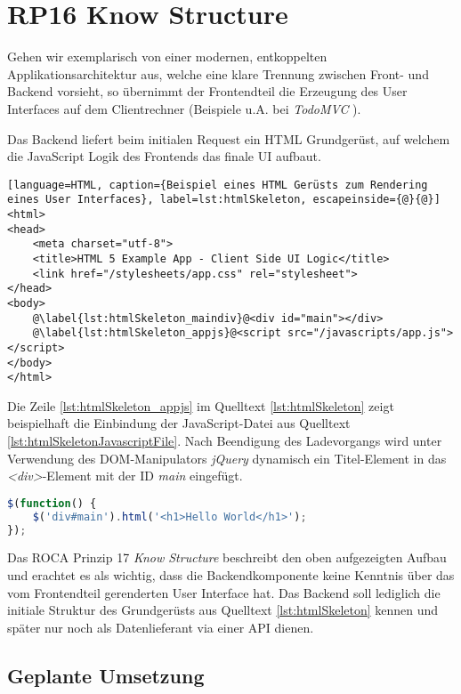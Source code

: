 \section{RP16 Know Structure}
\label{sec:principle-rp16-know-structure}

Gehen wir exemplarisch von einer modernen, entkoppelten Applikationsarchitektur aus, welche eine klare Trennung zwischen Front- und Backend vorsieht, so übernimmt der Frontendteil die Erzeugung des User Interfaces auf dem Clientrechner (Beispiele u.A. bei \emph{TodoMVC} \cite{TodoMVC}).

Das Backend liefert beim initialen Request ein HTML Grundgerüst, auf welchem die JavaScript Logik des Frontends das finale UI aufbaut.

\begin{lstlisting}[language=HTML, caption={Beispiel eines HTML Gerüsts zum Rendering eines User Interfaces}, label=lst:htmlSkeleton, escapeinside={@}{@}]
<html>
<head>
	<meta charset="utf-8">
	<title>HTML 5 Example App - Client Side UI Logic</title>
	<link href="/stylesheets/app.css" rel="stylesheet">
</head>
<body>
	@\label{lst:htmlSkeleton_maindiv}@<div id="main"></div>
	@\label{lst:htmlSkeleton_appjs}@<script src="/javascripts/app.js"></script>
</body>
</html>
\end{lstlisting}

Die Zeile \autoref{lst:htmlSkeleton_appjs} im Quelltext \ref{lst:htmlSkeleton} zeigt beispielhaft die Einbindung der JavaScript-Datei aus Quelltext \ref{lst:htmlSkeletonJavascriptFile}. Nach Beendigung des Ladevorgangs wird unter Verwendung des \gls{DOM}-Manipulators \emph{jQuery} \cite{jQuery} dynamisch ein Titel-Element in das \emph{<div>}-Element mit der ID \emph{main} eingefügt.

\begin{lstlisting}[language=JavaScript, caption={JavaScript-Datei \emph{app.js} zu Quelltext \ref{lst:htmlSkeleton}}, label=lst:htmlSkeletonJavascriptFile]
$(function() {
	$('div#main').html('<h1>Hello World</h1>');
});
\end{lstlisting}

Das ROCA Prinzip 17 \emph{Know Structure} beschreibt den oben aufgezeigten Aufbau und erachtet es als wichtig, dass die Backendkomponente keine Kenntnis über das vom Frontendteil gerenderten User Interface hat. Das Backend soll lediglich die initiale Struktur des Grundgerüsts aus Quelltext \ref{lst:htmlSkeleton} kennen und später nur noch als Datenlieferant via einer API dienen.


\subsection*{Geplante Umsetzung}

